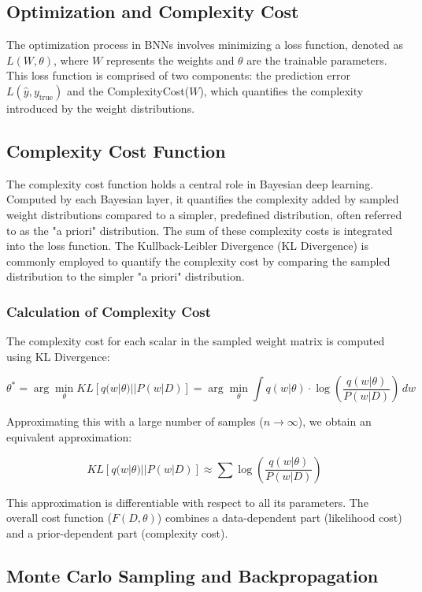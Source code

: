 \documentclass{article}
\begin{document}
\subsection{Optimization and Complexity Cost}

The optimization process in BNNs involves minimizing a loss function, denoted as $L(W, \theta)$, where $W$ represents the weights and $\theta$ are the trainable parameters. This loss function is comprised of two components: the prediction error $L(\hat{y}, y_{\text{true}})$ and the ComplexityCost($W$), which quantifies the complexity introduced by the weight distributions.

\subsection{Complexity Cost Function}

The complexity cost function holds a central role in Bayesian deep learning. Computed by each Bayesian layer, it quantifies the complexity added by sampled weight distributions compared to a simpler, predefined distribution, often referred to as the "a priori" distribution. The sum of these complexity costs is integrated into the loss function. The Kullback-Leibler Divergence (KL Divergence) is commonly employed to quantify the complexity cost by comparing the sampled distribution to the simpler "a priori" distribution.

\subsubsection{Calculation of Complexity Cost}

The complexity cost for each scalar in the sampled weight matrix is computed using KL Divergence:

\[
\theta^* = \arg\min_{\theta} KL[q(w|\theta)||P(w|D)] = \arg\min_{\theta} \int q(w|\theta) \cdot \log\left(\frac{q(w|\theta)}{P(w|D)}\right) \, dw
\]

Approximating this with a large number of samples (\(n \to \infty\)), we obtain an equivalent approximation:

\[
KL[q(w|\theta)||P(w|D)] \approx \sum \log\left(\frac{q(w|\theta)}{P(w|D)}\right)
\]

This approximation is differentiable with respect to all its parameters. The overall cost function ($F(D, \theta)$) combines a data-dependent part (likelihood cost) and a prior-dependent part (complexity cost).

\subsection{Monte Carlo Sampling and Backpropagation}
\end{document}
